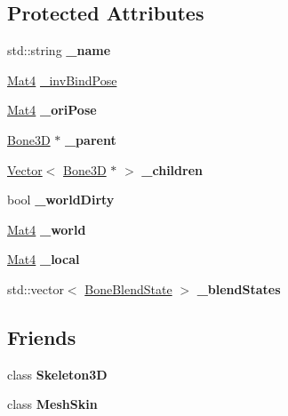 \subsection*{Protected Attributes}
\begin{DoxyCompactItemize}
\item 
\mbox{\label{classBone3D_a720d2e77e7cd2d086773da48a0bd1da2}} 
std\+::string {\bfseries \+\_\+name}
\item 
\hyperlink{classMat4}{Mat4} \hyperlink{classBone3D_ab8779fd741f178117b2dfe1cb8b79fb6}{\+\_\+inv\+Bind\+Pose}
\item 
\mbox{\label{classBone3D_a08a93263b5480db75910e70caaabbba6}} 
\hyperlink{classMat4}{Mat4} {\bfseries \+\_\+ori\+Pose}
\item 
\mbox{\label{classBone3D_abe6451c732f3970af49276f19844aec8}} 
\hyperlink{classBone3D}{Bone3D} $\ast$ {\bfseries \+\_\+parent}
\item 
\mbox{\label{classBone3D_acc6c10c42311fabc8f0fb0eb0f53c277}} 
\hyperlink{classVector}{Vector}$<$ \hyperlink{classBone3D}{Bone3D} $\ast$ $>$ {\bfseries \+\_\+children}
\item 
\mbox{\label{classBone3D_af3b9a48e06847eb5b2ca721f7a1d9c02}} 
bool {\bfseries \+\_\+world\+Dirty}
\item 
\mbox{\label{classBone3D_a09f2af0464181f7df04315d204124a92}} 
\hyperlink{classMat4}{Mat4} {\bfseries \+\_\+world}
\item 
\mbox{\label{classBone3D_af9272bcce10c04459452355928d91bf5}} 
\hyperlink{classMat4}{Mat4} {\bfseries \+\_\+local}
\item 
\mbox{\label{classBone3D_a2f5ce34dd1bd44bf03a4e782a5009cc4}} 
std\+::vector$<$ \hyperlink{structBone3D_1_1BoneBlendState}{Bone\+Blend\+State} $>$ {\bfseries \+\_\+blend\+States}
\end{DoxyCompactItemize}
\subsection*{Friends}
\begin{DoxyCompactItemize}
\item 
\mbox{\label{classBone3D_aeec6204f3e32150a6216bac5f5015e17}} 
class {\bfseries Skeleton3D}
\item 
\mbox{\label{classBone3D_a8a2d0104574751b55d55a41e1b14b2c4}} 
class {\bfseries Mesh\+Skin}
\end{DoxyCompactItemize}


